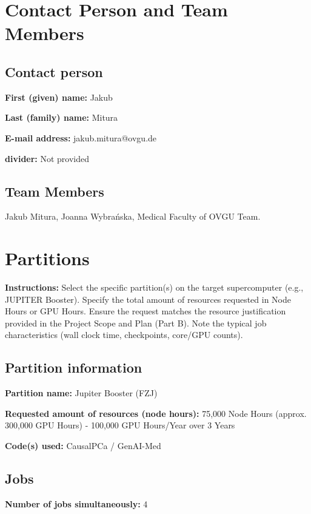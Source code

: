 \documentclass[12pt,a4paper]{article}
\begin{document}
\section*{Contact Person and Team Members}

\subsection*{Contact person}

\textbf{First (given) name:} Jakub

\textbf{Last (family) name:} Mitura

\textbf{E-mail address:} jakub.mitura@ovgu.de

\textbf{divider:} Not provided

\subsection*{Team Members}
Jakub Mitura, Joanna Wybrańska, Medical Faculty of OVGU Team.

\section*{Partitions}

\textbf{Instructions:} Select the specific partition(s) on the target supercomputer (e.g., JUPITER Booster). Specify the total amount of resources requested in Node Hours or GPU Hours. Ensure the request matches the resource justification provided in the Project Scope and Plan (Part B). Note the typical job characteristics (wall clock time, checkpoints, core/GPU counts).

\subsection*{Partition information}

\textbf{Partition name:} Jupiter Booster (FZJ)

\textbf{Requested amount of resources (node hours):} 75,000 Node Hours (approx. 300,000 GPU Hours) - 100,000 GPU Hours/Year over 3 Years

\textbf{Code(s) used:} CausalPCa / GenAI-Med

\subsection*{Jobs}

\textbf{Number of jobs simultaneously:} 4
\end{document}
